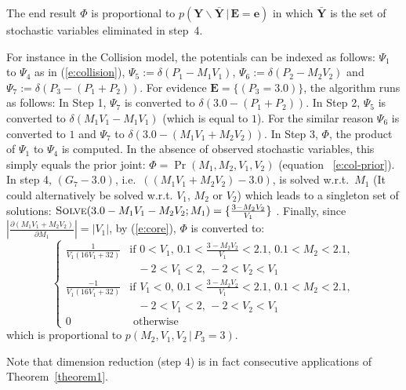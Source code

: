 \documentclass{article}
\newcommand{\bvec}[1]{\textbf{#1}}
\newcommand{\otherwise}[1]{#1 &\text{ otherwise}}
\newcommand{\pr}{p}
\begin{document}
The end result $\Phi$ is proportional to 
$\pr(\bvec{Y}\backslash \bar{\bvec{Y}} \,|\, \bvec{E} = \bvec{e})$ in which 
$\bar{\bvec{Y}}$ is the set of stochastic variables eliminated in
step~4.

For instance in the Collision model, 
the potentials can be indexed as follows: 
$\Psi_1$ to $\Psi_4$ as in (\ref{e:collision}),
$\Psi_5 := \delta(P_1 - M_1V_1)$,
$\Psi_6 := \delta(P_2 - M_2V_2)$ and
$\Psi_7 := \delta(P_3 - (P_1 + P_2))$.   
For evidence $\bvec{E} = \{(P_3 = 3.0)\}$, the algorithm runs as follows:
In Step 1, $\Psi_{7}$ is converted to $\delta(3.0 - (P_1 + P_2))$. %
In Step 2, $\Psi_5$ is converted to $\delta(M_1 V_1 - M_1 V_1)$
(which is equal to $1$). For the similar reason $\Psi_6$ is converted to $1$ and $\Psi_7$ to $\delta(3.0 - (M_1 V_1 + M_2 V_2))$.  
In Step 3, $\Phi$, the product of $\Psi_1$ to $\Psi_4$ is computed. In the absence of observed stochastic variables, this simply equals the prior joint: 
$\Phi = \Pr(M_1, M_2, V_1, V_2)$ (equation~ \ref{e:col-prior}).
In step 4, $(G_7 - 3.0)$, i.e.\ $((M_1 V_1 + M_2 V_2) - 3.0)$, is solved w.r.t.\ 
 $M_1$ (It could alternatively be solved w.r.t. $V_1$, $M_2$ or $V_2$)
which leads to a singleton set of solutions:
{\footnotesize
$\textsc{Solve}(3.0 - M_1 V_1 - M_2 V_2; M_1) = \{\frac{3 - M_2 V_2}{V_1}\}$
}.
Finally, since  
$\left| \frac{\partial (M_1 V_1 + M_2 V_2)}{\partial M_1} \right| = |V_1|$, by (\ref{e:core}),
$\Phi$ is converted to:  
{\footnotesize
\begin{equation}  
\label{e:col-prior2}
\begin{cases}
\frac{1}{V_1(16 V_1 + 32)} &{\text{if }\scriptstyle 0<V_1, \, 0.1<\frac{3-M_2 V_2}{V_1}<2.1, \, 0.1<M_2<2.1,}\\
							 &{\;\;\, \scriptstyle -2<V_1<2, \, -2<V_2 < V_1}\\
\frac{-1}{V_1(16 V_1 + 32)} &{\text{if }\scriptstyle V_1<0, \, 0.1<\frac{3-M_2 V_2}{V_1}<2.1, \, 0.1<M_2<2.1,}\\
							 &{\;\;\, \scriptstyle -2<V_1<2, \, -2<V_2 < V_1}\\
 \otherwise{0}
 \end{cases}
\end{equation}
}
which is proportional to $\pr(M_2, V_1, V_2 \,|\, P_3 = 3)$.

Note that dimension reduction (step 4) is 
in fact consecutive applications of  Theorem~\ref{theorem1}.
\end{document}
